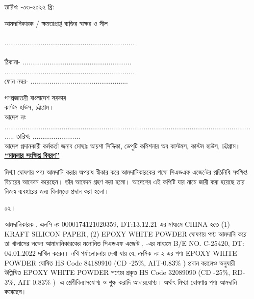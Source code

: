 \documentclass[12pt]{article}
\newcommand{\co}{CHINA}
\newcommand{\beno}{C-25420}
\newcommand{\bedt}{04.01.2022}
\newcommand{\lcno}{0000174121020359}
\newcommand{\lcdt}{13.12.21}
\newcommand{\impn}{\jeal}
\newcommand{\impadd}{\jeala}
\newcommand{\rodt}{\hspace{3em}-০৩-২০২২ খ্রি:}
\begin{document}
\begin{minipage}[t]{0.55\linewidth}
তারিখ: {\rodt}
\end{minipage}
\begin{minipage}[t]{0.45\linewidth}
আমদানিকারক / ক্ষমতাপ্রাপ্ত ব্যক্তির স্বাক্ষর ও সীল
\\
\\
....................................................................
\\
\\
ঠিকানা- .........................................................
\\
....................................................................
\\
ফোন নম্বর-  ...................................................
\end{minipage}
\thispagestyle{empty}
\newpage
{}
\fontsize{10pt}{10pt}\selectfont
\begin{center}
গণপ্রজাতন্ত্রী বাংলাদেশ সরকার
\\
কাস্টম হাউস, চট্টগ্রাম।
\\
আদেশ নং ...................................................................................................................................... তারিখ: .........................
\\
আদেশ প্রদানকারী কর্মকর্তা জনাব মোছাঃ আয়শা সিদ্দিকা, ডেপুটি কমিশনার অব কাস্টমস, কাস্টম হাউস, চট্টগ্রাম।
\\
\textbf{\underline{``মামলার সংক্ষিপ্ত বিবরণ''}}
\\
\end{center}
\begin{minipage}[t]{0.05\linewidth}
\hspace{0em}
\end{minipage}
\begin{minipage}[t]{0.95\linewidth}
মিথ্যা ঘোষণায় পণ্য আমদানি করার অপরাধ স্বীকার করে আমদানিকারকের পক্ষে
সিএন্ডএফ এজেন্টের প্রতিনিধি সংক্ষিপ্ত বিচারের আবেদন করেছেন।
তাঁর আবেদন গ্রহণ করা হলো। আদেশের এই কপিটি যার নামে জারী করা হয়েছে
তার নিজস্ব ব্যবহারের জন্য বিনামূল্যে প্রদান করা হলো।
\\
\end{minipage}
\begin{minipage}[t]{0.05\linewidth}
০২।
\end{minipage}
\begin{minipage}[t]{0.95\linewidth}
আমদানিকারক {\impn}, {\impadd}
এলসি নং-{\lcno}, DT:{\lcdt}
এর মাধ্যমে {\co}
হতে
(1) KRAFT SILICON PAPER,
(2) EPOXY WHITE POWDER
ঘোষণায় পণ্য আমদানি করে তা
খালাসের লক্ষ্যে আমাদানিকারকের
মনোনিত সিএন্ডএফ এজেন্ট
{\cnfn}, {\cnfadd} -এর
মাধ্যমে
B/E NO. {\beno}, DT: {\bedt}
দাখিল করেন।
নথি পর্যালোচনায় দেখা যায় যে,
ক্রমিক নং-২ এর পণ্য
EPOXY WHITE POWDER
ঘোষিত HS Code 84189910
(CD -25\%, AIT-0.83\% )
প্রদান করলেও
{\fsen}
অনুযায়ী উল্লিখিত
EPOXY WHITE POWDER
পণ্যের প্রকৃত HS Code 32089090
(CD -25\%, RD-3\%, AIT-0.83\% ) -এ
শ্রেণীবিন্যাসযোগ্য ও শুল্ক করাদি আদায়যোগ্য।
অর্থাৎ মিথ্যা ঘোষণায় পণ্য আমদানি করেছেন।
\end{minipage}
\end{document}
